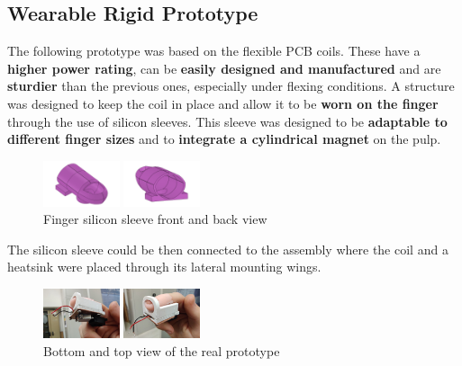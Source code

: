 \subsection{Wearable Rigid Prototype}
The following prototype was based on the flexible PCB coils. 
These have a \textbf{higher power rating}, can be \textbf{easily designed and manufactured} and are \textbf{sturdier} than the previous ones, especially under flexing conditions. 
A structure was designed to keep the coil in place and allow it to be \textbf{worn on the finger} through the use of silicon sleeves.
This sleeve was designed to be \textbf{adaptable to different finger sizes} and to \textbf{integrate a cylindrical magnet} on the pulp.
\begin{figure}[H]
    \centering
    \begin{subcaptiongroup}
        \centering
        \parbox[b]{0.2\textwidth}{
            \centering
            \includegraphics[width=0.2\textwidth]{Figures/silicon_sleeve_front.png}
        }
        \parbox[b]{0.2\textwidth}{
            \centering
            \includegraphics[width=0.2\textwidth]{Figures/silicon_sleeve_back.png}        
        }
    \end{subcaptiongroup}
    \caption{Finger silicon sleeve front and back view}
\end{figure}
The silicon sleeve could be then connected to the assembly where the coil and a heatsink were placed through its lateral mounting wings.
\begin{figure}[H]
    \centering
    \begin{subcaptiongroup}
        \centering
        \parbox[b]{0.2\textwidth}{
            \centering
            \includegraphics[width=0.2\textwidth]{Figures/rigid_prot_btm.png}
        }
        \parbox[b]{0.2\textwidth}{
            \centering
            \includegraphics[width=0.2\textwidth]{Figures/rigid_prot_top.png}
        }
    \end{subcaptiongroup}
    \caption{Bottom and top view of the real prototype}
\end{figure}
